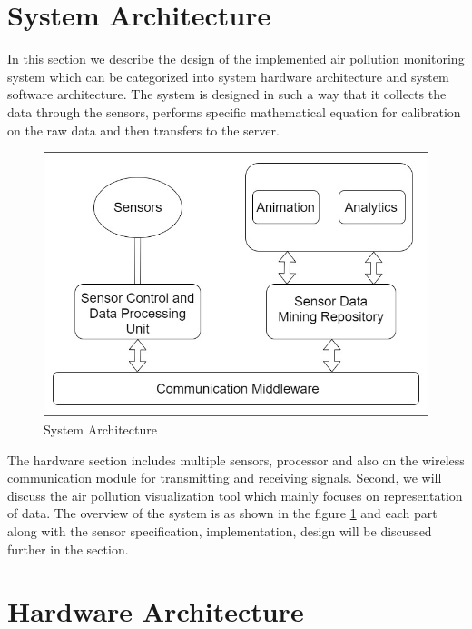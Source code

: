 \section{System Architecture}
    

     In this section we describe the design of the implemented air pollution monitoring system which can be categorized into system hardware architecture and system software architecture. The system is designed in such a way that it collects the data through the sensors, performs specific mathematical equation for calibration on the raw data and then transfers to the server. 

     \begin{figure}[h]
      \begin{center}
      \includegraphics[scale=0.70]{images/figure2.png}
      \end{center}
      \caption{System Architecture}
      \label{overview}
  
    \end{figure}

    The hardware section includes multiple sensors, processor and also on the wireless communication module for transmitting and receiving signals. Second, we will discuss the air pollution visualization tool which mainly focuses on representation of data. The overview of the system is as shown in the figure \ref{overview} and each part along with the sensor specification, implementation, design will be discussed further in the section. 


 \section{Hardware Architecture}
  
